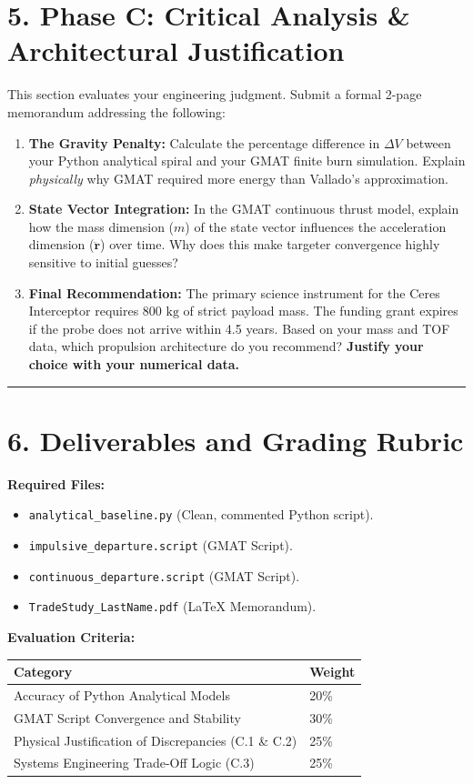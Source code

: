 \documentclass[11pt, letterpaper]{article}
\begin{document}
\section*{5. Phase C: Critical Analysis \& Architectural Justification}
This section evaluates your engineering judgment. Submit a formal 2-page memorandum addressing the following:

\begin{enumerate}[label=\textbf{C.\arabic*}]
    \item \textbf{The Gravity Penalty:} Calculate the percentage difference in $\Delta V$ between your Python analytical spiral and your GMAT finite burn simulation. Explain \textit{physically} why GMAT required more energy than Vallado's approximation. 
    \item \textbf{State Vector Integration:} In the GMAT continuous thrust model, explain how the mass dimension ($m$) of the state vector influences the acceleration dimension ($\ddot{\boldsymbol{r}}$) over time. Why does this make targeter convergence highly sensitive to initial guesses?
    \item \textbf{Final Recommendation:} The primary science instrument for the Ceres Interceptor requires $800 \text{ kg}$ of strict payload mass. The funding grant expires if the probe does not arrive within 4.5 years. Based on your mass and TOF data, which propulsion architecture do you recommend? \textbf{Justify your choice with your numerical data.}
\end{enumerate}

\vspace{0.5cm}
\hrule
\vspace{0.5cm}

\section*{6. Deliverables and Grading Rubric}

\textbf{Required Files:}
\begin{itemize}
    \item \texttt{analytical\_baseline.py} (Clean, commented Python script).
    \item \texttt{impulsive\_departure.script} (GMAT Script).
    \item \texttt{continuous\_departure.script} (GMAT Script).
    \item \texttt{TradeStudy\_LastName.pdf} (LaTeX Memorandum).
\end{itemize}

\textbf{Evaluation Criteria:}
\begin{center}
\begin{tabular}{@{}ll@{}}
\toprule
\textbf{Category} & \textbf{Weight} \\ \midrule
Accuracy of Python Analytical Models & 20\% \\
GMAT Script Convergence and Stability & 30\% \\
Physical Justification of Discrepancies (C.1 \& C.2) & 25\% \\
Systems Engineering Trade-Off Logic (C.3) & 25\% \\ \bottomrule
\end{tabular}
\end{center}
\end{document}
